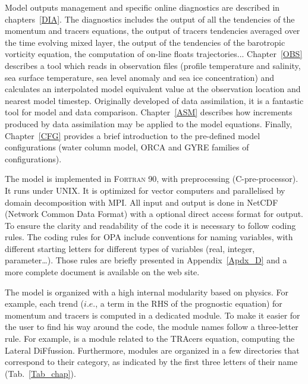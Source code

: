 \documentclass[NEMO_book]{subfiles}
\begin{document}

Model outputs management and specific online diagnostics are described in chapters~\ref{DIA}.
The diagnostics includes the output of all the tendencies of the momentum and tracers equations, 
the output of tracers tendencies averaged over the time evolving mixed layer, the output of 
the tendencies of the barotropic vorticity equation, the computation of on-line floats trajectories... 
Chapter~\ref{OBS} describes a tool which reads in observation files (profile temperature 
and salinity, sea surface temperature, sea level anomaly and sea ice concentration) 
and calculates an interpolated model equivalent value at the observation location 
and nearest model timestep. Originally developed of data assimilation, it is a fantastic 
tool for model and data comparison. Chapter~\ref{ASM} describes how increments 
produced by data assimilation may be applied to the model equations.
Finally, Chapter~\ref{CFG} provides a brief introduction to the pre-defined model 
configurations (water column model, ORCA and GYRE families of configurations).

The model is implemented in \textsc{Fortran 90}, with preprocessing (C-pre-processor). 
It runs under UNIX. It is optimized for vector computers and parallelised by domain  
decomposition with MPI. All input and output is done in NetCDF (Network Common Data 
Format) with a optional direct access format for output. To ensure the clarity and 
readability of the code it is necessary to follow coding rules. The coding rules for OPA 
include conventions for naming variables, with different starting letters for different types 
of variables (real, integer, parameter\ldots). Those rules are briefly presented in 
Appendix~\ref{Apdx_D} and a more complete document is available on the \NEMO web site.

The model is organized with a high internal modularity based on physics. For example, 
each trend ($i.e.$, a term in the RHS of the prognostic equation) for momentum and 
tracers is computed in a dedicated module.  To make it easier for the user to find his way 
around the code, the module names follow a three-letter rule. For example,  
is a module related to the TRAcers equation, computing the Lateral DiFfussion. 
Furthermore, modules are organized in a few directories that correspond to their category, 
as indicated by the first three letters of their name (Tab.~\ref{Tab_chap}). 
\end{document}
